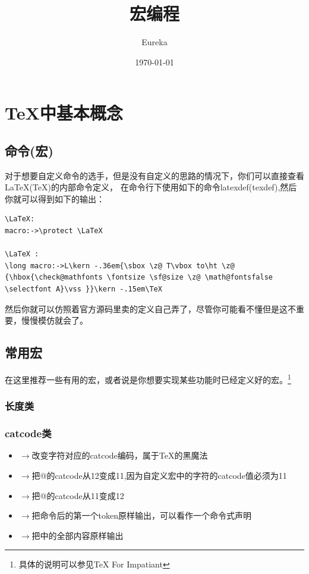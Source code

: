\documentclass[12pt]{article}
\title{宏编程}
\author{Eureka}
\date{\today}
\newcounter{Footnote}
\newcommand{\Footnote}[1]{\footnote[\theFootnote]{#1}\stepcounter{Footnote}}
\def\Cmd#1{{\ttfamily\detokenize{#1}}}
\def\cmd#1{{\ttfamily\string#1}}
\def\lr{\ensuremath{\rightarrow}\;}
\begin{document}
\tableofcontents
\thispagestyle{empty}
\clearpage

\section{\TeX{}中基本概念}
\subsection{命令(宏)}
对于想要自定义命令的选手，但是没有自定义的思路的情况下，你们可以直接查看\LaTeX{}(\TeX)的内部命令定义，
在命令行下使用如下的命令latexdef(texdef),然后你就可以得到如下的输出：

\begin{lstlisting}[basicstyle=\fontsize{4.5}{6}\selectfont\ttfamily]
\LaTeX:
macro:->\protect \LaTeX

\LaTeX :
\long macro:->L\kern -.36em{\sbox \z@ T\vbox to\ht \z@ {\hbox{\check@mathfonts \fontsize \sf@size \z@ \math@fontsfalse \selectfont A}\vss }}\kern -.15em\TeX
\end{lstlisting}

然后你就可以仿照着官方源码里卖的定义自己弄了，尽管你可能看不懂但是这不重要，慢慢模仿就会了。

\subsection{常用宏}
在这里推荐一些有用的宏，或者说是你想要实现某些功能时已经定义好的宏。\Footnote{具体的说明可以参见\TeX{} For Impatiant}

\subsubsection{长度类}

\subsubsection{catcode类}
\begin{itemize}
    \item \cmd{\catcode} \lr 改变字符对应的catcode编码，属于\TeX{}的黑魔法
    \item \cmd{\makeatletter} \lr 把@的catcode从12变成11,因为自定义宏中的字符的catcode值必须为11
    \item \cmd{\makeatother} \lr 把@的catcode从11变成12
    \item \cmd{\string} \lr 把命令后的第一个\cmd{token}原样输出，可以看作一个命令式声明
    \item \cmd{\detokenize{}} \lr 把\Cmd{{}}中的全部内容原样输出
\end{itemize}
\end{document}

